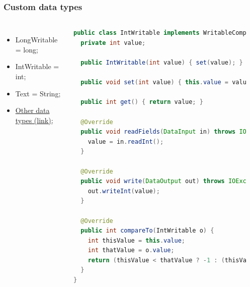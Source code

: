 \documentclass[aspectratio=169]{beamer}
\begin{document}
\begin{frame}[fragile]
	\frametitle{Custom data types}

	\begin{columns}
		\begin{itemize}
			\item LongWritable = long;
			\item IntWritable = int;
			\item Text = String;
			\item \href{https://hadoop.apache.org/docs/current/api/org/apache/hadoop/io/package-summary.html}{Other data types (link);}
		\end{itemize}


		\begin{lstlisting}[language=java,basicstyle=\tiny,columns=fullflexible]
public class IntWritable implements WritableComparable<IntWritable> {
  private int value;

  public IntWritable(int value) { set(value); }

  public void set(int value) { this.value = value; }

  public int get() { return value; }

  @Override
  public void readFields(DataInput in) throws IOException {
    value = in.readInt();
  }

  @Override
  public void write(DataOutput out) throws IOException {
    out.writeInt(value);
  }

  @Override
  public int compareTo(IntWritable o) {
    int thisValue = this.value;
    int thatValue = o.value;
    return (thisValue < thatValue ? -1 : (thisValue == thatValue ? 0 : 1));
  }
}
        \end{lstlisting}
		{\tiny \href{https://github.com/apache/hadoop/blob/master/hadoop-common-project/hadoop-common/src/main/java/org/apache/hadoop/io/IntWritable.java}{}}
	\end{columns}
\end{frame}
\end{document}
